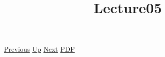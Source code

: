 \documentclass[12pt,a4paper]{report}
\begin{document}
 \href{doc/phil/People/Brandom/Antirepresentationalism/Lecture04.html}{Previous} 
 \href{doc/phil/People/Brandom/Antirepresentationalism.html}{Up} 
 \href{doc/phil/People/Brandom/Antirepresentationalism/Lecture06.html}{Next} 
 \href{doc/phil/People/Brandom/Antirepresentationalism/Lecture05.pdf}{PDF} 
\title{Lecture05}

\tableofcontents
\end{document}
